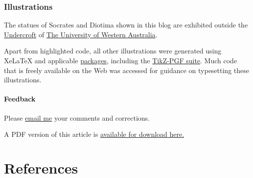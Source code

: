 \documentclass[
  11pt,
  british,
  a4paper,
]{article}
\begin{document}
\hypertarget{illustrations}{%
\subsubsection{Illustrations}\label{illustrations}}

The statues of Socrates and Diotima shown in this blog are exhibited
outside the
\href{https://www.uwa.edu.au/theatres/venues/undercroft}{Undercroft} of
\href{https://www.uwa.edu.au/}{The University of Western Australia}.

Apart from highlighted code, all other illustrations were generated
using XeLaTeX and applicable
\href{https://ctan.org/pkg?lang=en}{packages}, including the
\href{https://github.com/pgf-tikz/pgf}{TikZ-PGF suite}. Much code that
is freely available on the Web was accessed for guidance on typesetting
these illustrations.

\hypertarget{feedback}{%
\paragraph{Feedback}\label{feedback}}

Please \href{mailto:feedback.swanlotus@gmail.com}{email me} your
comments and corrections.

\noindent A PDF version of this article is
\href{./the-making-of-a-logo.pdf}{available for download here.}

\hypertarget{bibliography}{%
\section*{References}\label{bibliography}}
\end{document}
